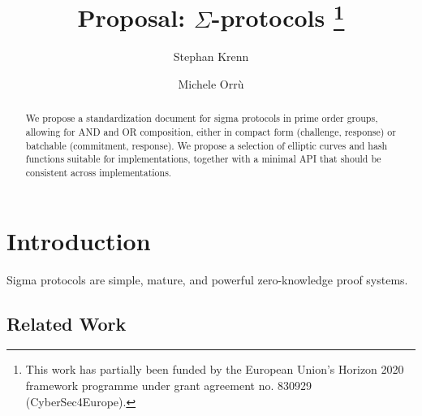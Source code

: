 \documentclass[runningheads]{llncs}
\begin{document}
\title{Proposal: $\Sigma$-protocols%
\thanks{This work has partially been funded by the European Union's Horizon 2020 framework programme under grant agreement no. 830929 (CyberSec4Europe).}}
%

\author{Stephan Krenn\and
        Michele Orr\`u}


%
\maketitle              %
%
\begin{abstract}
  We propose a standardization document for sigma protocols in prime order groups, allowing for AND and OR composition, either in compact form (challenge, response) or batchable (commitment, response). We propose a selection of elliptic curves and hash functions suitable for implementations, together with a minimal API that should be consistent across implementations.

\end{abstract}

\section{Introduction}

Sigma protocols are simple, mature, and powerful zero-knowledge proof systems.


\subsection{Related Work}
\end{document}
